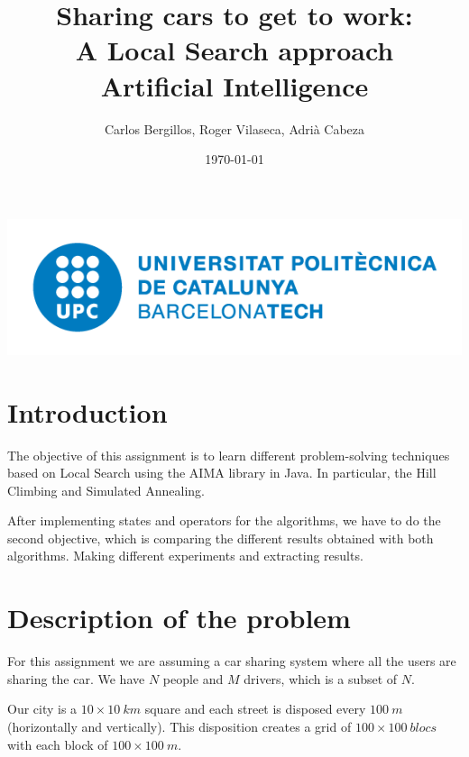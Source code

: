 \documentclass[12]{article}
\author{Carlos Bergillos, Roger Vilaseca, Adrià Cabeza}
\title{\textbf{Sharing cars to get to work:\\ A Local Search approach}\\ \bigskip Artificial Intelligence}
\date{\today}
\begin{document}
\maketitle
\vspace*{\fill}
\begin{center}
\includegraphics[scale=0.5]{images/UPClogo.png}
\end{center}
 
\newpage
\tableofcontents
\newpage
\section{Introduction}

The objective of this assignment is to learn different problem-solving techniques based on Local Search using the AIMA library in Java.
In particular, the Hill Climbing and Simulated Annealing.

After implementing states and operators for the algorithms, we have to do the second objective, which is comparing the different results obtained with both algorithms.
Making different experiments and extracting results.

\section{Description of the problem}

For this assignment we are assuming a car sharing system where all the users are sharing the car. We have $N$ people and $M$ drivers, which is a subset of $N$. 

Our city is a $10\times10\ km$ square and each street is disposed every $100\ m$ (horizontally and vertically). This disposition creates a grid of $100\times100\ blocs$ with each block of $100\times100\ m$.
\end{document}
